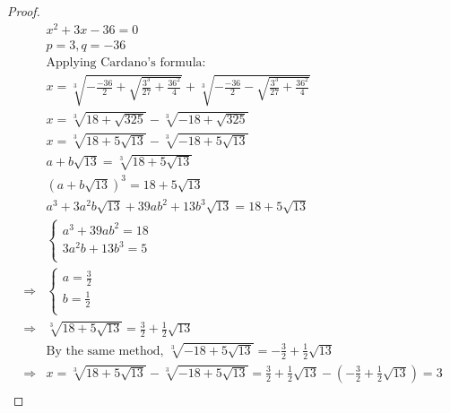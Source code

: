 \documentclass{article}
\begin{document}
\begin{proof}
    \begin{align*}
        &x^2+3x-36=0\\
        &p=3,q=-36\\
        &\text{Applying Cardano's formula}:\\
        &x=\sqrt[3]{-\frac{-36}{2}+\sqrt{\frac{3^3}{27}+\frac{36^2}{4}}}+\sqrt[3]{-\frac{-36}{2}-\sqrt{\frac{3^3}{27}+\frac{36^2}{4}}}\\
        &x=\sqrt[3]{18+\sqrt{325}}-\sqrt[3]{-18+\sqrt{325}}\\
        &x=\sqrt[3]{18+5\sqrt{13}}-\sqrt[3]{-18+5\sqrt{13}}\\
        &a+b\sqrt{13}=\sqrt[3]{18+5\sqrt{13}}\\
        &(a+b\sqrt{13})^3=18+5\sqrt{13}\\
        &a^3+3a^2b\sqrt{13}+39ab^2+13b^3\sqrt{13}=18+5\sqrt{13}\\
        &\begin{cases}
            a^3+39ab^2=18\\
            3a^2b+13b^3=5\\
        \end{cases}\\
        \Rightarrow&\begin{cases}
            a=\frac{3}{2}\\
            b=\frac{1}{2}\\
        \end{cases}\\
        \Rightarrow&\sqrt[3]{18+5\sqrt{13}}=\frac{3}{2}+\frac{1}{2}\sqrt{13}\\
        &\text{By the same method, }\sqrt[3]{-18+5\sqrt{13}}=-\frac{3}{2}+\frac{1}{2}\sqrt{13}\\
        \Rightarrow&x=\sqrt[3]{18+5\sqrt{13}}-\sqrt[3]{-18+5\sqrt{13}}=\frac{3}{2}+\frac{1}{2}\sqrt{13}-(-\frac{3}{2}+\frac{1}{2}\sqrt{13})=3\\
    \end{align*}
\end{proof}
\end{document}
